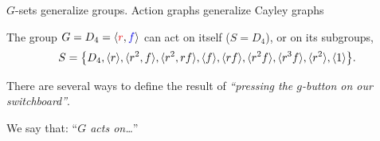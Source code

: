 \documentclass[8pt,handout]{beamer}
\newcommand{\Pause}{}      %
\begin{document}

\begin{frame}{$G$-sets generalize groups. Action graphs generalize Cayley graphs} 
  
  The group $G=D_4=\<{\color{xRed}r},{\color{xBlue}f}\>$ can act on
  itself ($S=D_4$), or on its subgroups,
  \[
  S=\big\{D_4,\langle r\rangle,\langle r^2,f\rangle,\langle r^2,rf\rangle,
  \langle f\rangle,\langle rf\rangle,\langle r^2f\rangle,\langle r^3f\rangle,\langle r^2\rangle,\langle1\rangle\big\}.
  \]

  \Pause
  
  There are several ways to define the result of
  \emph{``pressing the $g$-button on our switchboard''}. \medskip\Pause
  
  We say that: ``\emph{$G$ acts on\dots}''
  
  \vspace{-2mm}


\end{frame}
\end{document}

